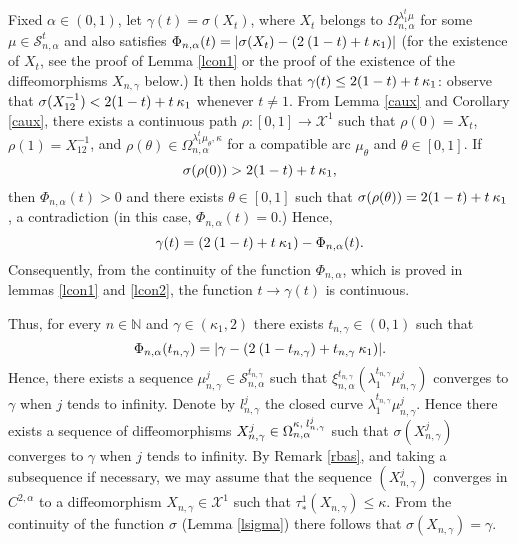 \documentclass{article}
\begin{document}
Fixed $\alpha\in(0,1)$, let $\gamma(t)=\sigma(X_t)$, where $X_t$ belongs to $\Omega_{n,\alpha}^{\lambda_1^t\mu}$ for some $\mu\in \mathcal S_{n,\alpha}^t$ and also satisfies
$\Phi_{n,\alpha}(t)=|\sigma(X_t)-(2\hspace{.03in}(1-t)+t\hspace{.03in} \kappa_1)|$ (for the existence of $X_t$, see the proof of Lemma \ref{lcon1} or the proof of the existence of the diffeomorphisms $X_{n,\gamma}$ below.)
It then holds that $\gamma(t)\leq 2(1-t)+t\hspace{.03in} \kappa_1$: observe that
$\sigma(X_{12}^{-1})<2(1-t)+t\hspace{.03in} \kappa_1$ whenever $t\neq 1$. From Lemma \ref{caux} and Corollary \ref{caux}, there exists a continuous path $\rho:[0,1]\to \mathcal X^1$ such that $\rho(0)=X_t$, 
$\rho(1)=X_{12}^{-1}$, and
$\rho(\theta)\in\Omega_{n,\alpha}^{\lambda_1^t\mu_\theta,\kappa}$ for a compatible arc $\mu_\theta$ and $\theta\in[0,1]$. If $$\sigma(\rho(0))> 2(1-t)+t\hspace{.03in} \kappa_1,$$ then $\Phi_{n,\alpha}(t)>0$ and there exists $\theta\in[0,1]$ such that $\sigma(\rho(\theta))= 2(1-t)+t\hspace{.03in} \kappa_1$, a contradiction (in this case, $\Phi_{n,\alpha}(t)=0$.) Hence, 
$$\gamma(t)=(2\hspace{.03in}(1-t)+t\hspace{.03in} \kappa_1)-\Phi_{n,\alpha}(t).$$ Consequently, from the continuity of the function $\Phi_{n,\alpha}$, which is proved in lemmas \ref{lcon1} and    \ref{lcon2}, the function $t\to\gamma(t)$ is continuous.


Thus,  for every $n\in \mathbb N$ and $\gamma\in(\kappa_1,2)$ there exists 
$t_{n,\gamma}\in(0,1)$ such that 
\begin{equation}
\Phi_{n,\alpha}(t_{n,\gamma})=|\gamma-(2\hspace{.03in}(1-t_{n,\gamma})+t_{n,\gamma}\hspace{.03in} \kappa_1)|.
\end{equation}
Hence, there exists a sequence $\mu^j_{n,\gamma}\in \mathcal S_{n,\alpha}^{t_{n,\gamma}}$ such that $\xi_{n,\alpha}^{t_{n,\gamma}}(\lambda_1^{t_{n,\gamma}}\mu^j_{n,\gamma})$ converges to $\gamma$ when $j$ tends to infinity. 
Denote by $l_{n,\gamma}^j$ the closed curve $\lambda_1^{t_{n,\gamma}}\mu^j_{n,\gamma}$.
Hence there exists a sequence of diffeomorphisms $X_{n,\gamma}^j\in\Omega_{n,\alpha}^{\kappa,\hspace{.03in}l_{n,\gamma}^j}$ such that $\sigma(X_{n,\gamma}^j)$ converges to $\gamma$ when $j$ tends to infinity. By Remark \ref{rbas}, and taking a subsequence if necessary, we may assume that the sequence $(X_{n,\gamma}^j)$ converges in $C^{2,\alpha}$ to a diffeomorphism $X_{n,\gamma}\in \mathcal X^1$ such that $\tau_*^1(X_{n,\gamma})\leq\kappa$. From the continuity of the function $\sigma$ (Lemma \ref{lsigma}) there follows that $\sigma(X_{n,\gamma})=\gamma$. 
\end{document}
